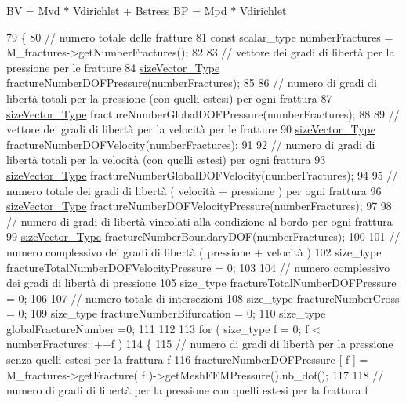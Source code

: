 B\-V = Mvd $\ast$ Vdirichlet + Bstress B\-P = Mpd $\ast$ Vdirichlet 
\begin{DoxyCode}
79 \{
80     \textcolor{comment}{// numero totale delle fratture}
81     \textcolor{keyword}{const} scalar\_type numberFractures = M\_fractures->getNumberFractures();
82     
83     \textcolor{comment}{// vettore dei gradi di libertà per la pressione per le fratture}
84     \hyperlink{Core_8h_a83c51913d041a5001e8683434c09857f}{sizeVector\_Type} fractureNumberDOFPressure(numberFractures);
85 
86     \textcolor{comment}{// numero di gradi di libertà totali per la pressione (con quelli estesi) per ogni frattura }
87     \hyperlink{Core_8h_a83c51913d041a5001e8683434c09857f}{sizeVector\_Type} fractureNumberGlobalDOFPressure(numberFractures);
88 
89     \textcolor{comment}{// vettore dei gradi di libertà per la velocità per le fratture}
90     \hyperlink{Core_8h_a83c51913d041a5001e8683434c09857f}{sizeVector\_Type} fractureNumberDOFVelocity(numberFractures);
91 
92     \textcolor{comment}{// numero di gradi di libertà totali per la velocità (con quelli estesi) per ogni frattura }
93     \hyperlink{Core_8h_a83c51913d041a5001e8683434c09857f}{sizeVector\_Type} fractureNumberGlobalDOFVelocity(numberFractures);
94 
95     \textcolor{comment}{// numero totale dei gradi di libertà ( velocità + pressione ) per ogni frattura}
96     \hyperlink{Core_8h_a83c51913d041a5001e8683434c09857f}{sizeVector\_Type} fractureNumberDOFVelocityPressure(numberFractures);
97 
98     \textcolor{comment}{// numero di gradi di libertà vincolati alla condizione al bordo per ogni frattura}
99     \hyperlink{Core_8h_a83c51913d041a5001e8683434c09857f}{sizeVector\_Type} fractureNumberBoundaryDOF(numberFractures);
100 
101     \textcolor{comment}{// numero complessivo dei gradi di libertà ( pressione + velocità ) }
102     size\_type fractureTotalNumberDOFVelocityPressure = 0;
103 
104     \textcolor{comment}{// numero complessivo dei gradi di libertà di pressione }
105     size\_type fractureTotalNumberDOFPressure = 0;
106 
107     \textcolor{comment}{// numero totale di intersezioni}
108     size\_type fractureNumberCross = 0;
109     size\_type fractureNumberBifurcation = 0;
110     size\_type globalFractureNumber =0;
111 
112     
113     \textcolor{keywordflow}{for} ( size\_type f = 0; f < numberFractures; ++f )
114     \{
115         \textcolor{comment}{// numero di gradi di libertà per la pressione senza quelli estesi per la frattura f}
116         fractureNumberDOFPressure [ f ] = M\_fractures->getFracture( f )->getMeshFEMPressure().nb\_dof();
117         
118         \textcolor{comment}{// numero di gradi di libertà per la pressione con quelli estesi per la frattura f}

\end{DoxyCode}
